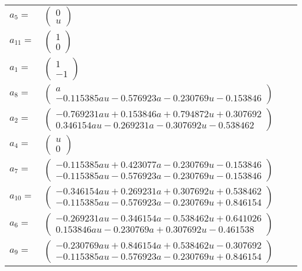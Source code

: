 \documentclass[1p]{elsarticle_modified}
\theoremstyle{definition}
\begin{document}
\begin{tabular}{m{7pt} m{180pt} m{7pt} m{180pt} }
\flushright $a_{5}=$&$\begin{pmatrix}0\\u\end{pmatrix}$ \\
\flushright $a_{11}=$&$\begin{pmatrix}1\\0\end{pmatrix}$ \\
\flushright $a_{1}=$&$\begin{pmatrix}1\\-1\end{pmatrix}$ \\
\flushright $a_{8}=$&$\begin{pmatrix}a\\-0.115385 a u-0.576923 a-0.230769 u-0.153846\end{pmatrix}$ \\
\flushright $a_{2}=$&$\begin{pmatrix}-0.769231 a u+0.153846 a+0.794872 u+0.307692\\0.346154 a u-0.269231 a-0.307692 u-0.538462\end{pmatrix}$ \\
\flushright $a_{4}=$&$\begin{pmatrix}u\\0\end{pmatrix}$ \\
\flushright $a_{7}=$&$\begin{pmatrix}-0.115385 a u+0.423077 a-0.230769 u-0.153846\\-0.115385 a u-0.576923 a-0.230769 u-0.153846\end{pmatrix}$ \\
\flushright $a_{10}=$&$\begin{pmatrix}-0.346154 a u+0.269231 a+0.307692 u+0.538462\\-0.115385 a u-0.576923 a-0.230769 u+0.846154\end{pmatrix}$ \\
\flushright $a_{6}=$&$\begin{pmatrix}-0.269231 a u-0.346154 a-0.538462 u+0.641026\\0.153846 a u-0.230769 a+0.307692 u-0.461538\end{pmatrix}$ \\
\flushright $a_{9}=$&$\begin{pmatrix}-0.230769 a u+0.846154 a+0.538462 u-0.307692\\-0.115385 a u-0.576923 a-0.230769 u+0.846154\end{pmatrix}$ \\

\end{tabular}
\end{document}
